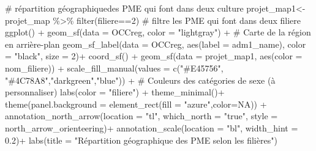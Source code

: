\documentclass[
  letterpaper,
  DIV=11,
  numbers=noendperiod]{scrartcl}
\newenvironment{Shaded}{\begin{snugshade}}{\end{snugshade}}
\newcommand{\AttributeTok}[1]{\textcolor[rgb]{0.40,0.45,0.13}{#1}}
\newcommand{\CommentTok}[1]{\textcolor[rgb]{0.37,0.37,0.37}{#1}}
\newcommand{\ConstantTok}[1]{\textcolor[rgb]{0.56,0.35,0.01}{#1}}
\newcommand{\DecValTok}[1]{\textcolor[rgb]{0.68,0.00,0.00}{#1}}
\newcommand{\FloatTok}[1]{\textcolor[rgb]{0.68,0.00,0.00}{#1}}
\newcommand{\FunctionTok}[1]{\textcolor[rgb]{0.28,0.35,0.67}{#1}}
\newcommand{\NormalTok}[1]{\textcolor[rgb]{0.00,0.23,0.31}{#1}}
\newcommand{\OtherTok}[1]{\textcolor[rgb]{0.00,0.23,0.31}{#1}}
\newcommand{\SpecialCharTok}[1]{\textcolor[rgb]{0.37,0.37,0.37}{#1}}
\newcommand{\StringTok}[1]{\textcolor[rgb]{0.13,0.47,0.30}{#1}}
\begin{document}
\begin{Shaded}
\begin{Highlighting}[]
\CommentTok{\# répartition géographiquedes PME qui font dans deux  culture}
\NormalTok{projet\_map1}\OtherTok{\textless{}{-}}\NormalTok{projet\_map }\SpecialCharTok{\%\textgreater{}\%} \FunctionTok{filter}\NormalTok{(filiere}\SpecialCharTok{==}\DecValTok{2}\NormalTok{) }\CommentTok{\# filtre les PME qui font dans deux filiere}
\FunctionTok{ggplot}\NormalTok{() }\SpecialCharTok{+}
  \FunctionTok{geom\_sf}\NormalTok{(}\AttributeTok{data =}\NormalTok{ OCCreg, }\AttributeTok{color =} \StringTok{"lightgray"}\NormalTok{) }\SpecialCharTok{+}  \CommentTok{\# Carte de la région en arrière{-}plan}
  \FunctionTok{geom\_sf\_label}\NormalTok{(}\AttributeTok{data =}\NormalTok{ OCCreg, }\FunctionTok{aes}\NormalTok{(}\AttributeTok{label =}\NormalTok{ adm1\_name), }\AttributeTok{color =} \StringTok{"black"}\NormalTok{, }\AttributeTok{size =} \DecValTok{2}\NormalTok{)}\SpecialCharTok{+}
  \FunctionTok{coord\_sf}\NormalTok{() }\SpecialCharTok{+}
  \FunctionTok{geom\_sf}\NormalTok{(}\AttributeTok{data =}\NormalTok{ projet\_map1, }\FunctionTok{aes}\NormalTok{(}\AttributeTok{color =}\NormalTok{ nom\_filiere)) }\SpecialCharTok{+}
  \FunctionTok{scale\_fill\_manual}\NormalTok{(}\AttributeTok{values =} \FunctionTok{c}\NormalTok{(}\StringTok{"\#E45756"}\NormalTok{, }\StringTok{"\#4C78A8"}\NormalTok{,}\StringTok{"darkgreen"}\NormalTok{,}\StringTok{"blue"}\NormalTok{)) }\SpecialCharTok{+}  \CommentTok{\# Couleurs des catégories de sexe (à personnaliser)}
  \FunctionTok{labs}\NormalTok{(}\AttributeTok{color =} \StringTok{"filiere"}\NormalTok{) }\SpecialCharTok{+}
  \FunctionTok{theme\_minimal}\NormalTok{()}\SpecialCharTok{+}
  \FunctionTok{theme}\NormalTok{(}\AttributeTok{panel.background =} \FunctionTok{element\_rect}\NormalTok{(}\AttributeTok{fill =} \StringTok{"azure"}\NormalTok{,}\AttributeTok{color=}\ConstantTok{NA}\NormalTok{)) }\SpecialCharTok{+}
  \FunctionTok{annotation\_north\_arrow}\NormalTok{(}\AttributeTok{location =} \StringTok{"tl"}\NormalTok{, }\AttributeTok{which\_north =} \StringTok{"true"}\NormalTok{, }\AttributeTok{style =}\NormalTok{ north\_arrow\_orienteering)}\SpecialCharTok{+}
  \FunctionTok{annotation\_scale}\NormalTok{(}\AttributeTok{location =} \StringTok{"bl"}\NormalTok{, }\AttributeTok{width\_hint =} \FloatTok{0.2}\NormalTok{)}\SpecialCharTok{+}
  \FunctionTok{labs}\NormalTok{(}\AttributeTok{title =} \StringTok{"Répartition géographique des PME selon les filières"}\NormalTok{)}
\end{Highlighting}
\end{Shaded}
\end{document}
